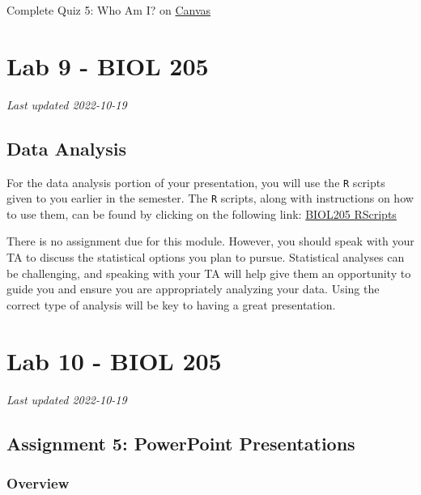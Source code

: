 \documentclass[
]{book}
\begin{document}
Complete Quiz 5: Who Am I? on \href{https://canvas.ubc.ca/courses/113910}{Canvas}

\hypertarget{part-lab-9---biol-205}{%
\part*{Lab 9 - BIOL 205}\label{part-lab-9---biol-205}}

\emph{Last updated 2022-10-19}

\hypertarget{data-analysis}{%
\chapter*{Data Analysis}\label{data-analysis}}

For the data analysis portion of your presentation, you will use the \texttt{R} scripts given to you earlier in the semester. The \texttt{R} scripts, along with instructions on how to use them, can be found by clicking on the following link: \href{https://ubco-biology.github.io/BIOL-205-Lab-Manual/using-the-rscripts.html}{BIOL205 RScripts}

There is no assignment due for this module. However, you should speak with your TA to discuss the statistical options you plan to pursue. Statistical analyses can be challenging, and speaking with your TA will help give them an opportunity to guide you and ensure you are appropriately analyzing your data. Using the correct type of analysis will be key to having a great presentation.

\hypertarget{part-lab-10---biol-205}{%
\part*{Lab 10 - BIOL 205}\label{part-lab-10---biol-205}}

\emph{Last updated 2022-10-19}

\hypertarget{assignment-5-powerpoint-presentations}{%
\chapter*{Assignment 5: PowerPoint Presentations}\label{assignment-5-powerpoint-presentations}}

\hypertarget{overview-3}{%
\section*{Overview}\label{overview-3}}
\end{document}
